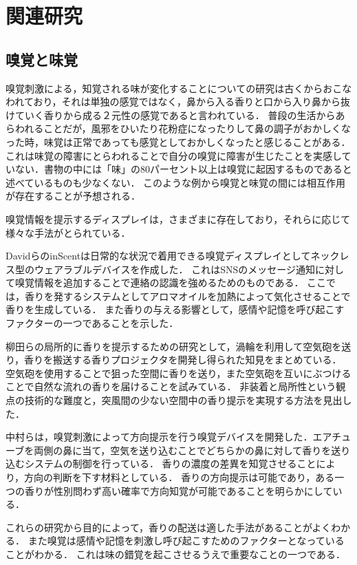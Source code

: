 \section{関連研究}






\subsection{嗅覚と味覚}
嗅覚刺激による，知覚される味が変化することについての研究は古くからおこなわれており，それは単独の感覚ではなく，鼻から入る香りと口から入り鼻から抜けていく香りから成る２元性の感覚であると言われている\cite{keiro}．
普段の生活からあらわれることだが，風邪をひいたり花粉症になったりして鼻の調子がおかしくなった時，味覚は正常であっても感覚としておかしくなったと感じることがある．これは味覚の障害にとらわれることで自分の嗅覚に障害が生じたことを実感していない．書物の中には「味」の80パーセント以上は嗅覚に起因するものであると述べているものも少なくない\cite{book}．
このような例から嗅覚と味覚の間には相互作用が存在することが予想される．

嗅覚情報を提示するディスプレイは，さまざまに存在しており，それらに応じて様々な手法がとられている．

DavidらのinScent\cite{incent}は日常的な状況で着用できる嗅覚ディスプレイとしてネックレス型のウェアラブルデバイスを作成した．
これはSNSのメッセージ通知に対して嗅覚情報を追加することで連絡の認識を強めるためのものである．
ここでは，香りを発するシステムとしてアロマオイルを加熱によって気化させることで香りを生成している．
また香りの与える影響として，感情や記憶を呼び起こすファクターの一つであることを示した．

柳田らの局所的に香りを提示するための研究として，渦輪を利用して空気砲を送り，香りを搬送する香りプロジェクタ\cite{uzuwa}を開発し得られた知見をまとめている．
空気砲を使用することで狙った空間に香りを送り，また空気砲を互いにぶつけることで自然な流れの香りを届けることを試みている．
非装着と局所性という観点の技術的な難度と，突風間の少ない空間中の香り提示を実現する方法を見出した．

中村らは，嗅覚刺激によって方向提示を行う嗅覚デバイス\cite{nakamura1}を開発した．エアチューブを両側の鼻に当て，空気を送り込むことでどちらかの鼻に対して香りを送り込むシステムの制御を行っている．
香りの濃度の差異を知覚させることにより，方向の判断を下す材料としている．
香りの方向提示は可能であり，ある一つの香りが性別問わず高い確率で方向知覚が可能であることを明らかにしている．

これらの研究から目的によって，香りの配送は適した手法があることがよくわかる．
また嗅覚は感情や記憶を刺激し呼び起こすためのファクターとなっていることがわかる．
これは味の錯覚を起こさせるうえで重要なことの一つである．



